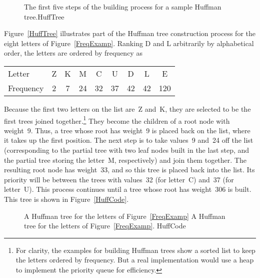 \begin{figure}
{The first five steps of the building process for a sample Huffman
tree.}{HuffTree}
\end{figure}

\begin{example}
Figure~\ref{HuffTree} illustrates part of the Huffman tree
construction process for the eight letters of Figure~\ref{FreqExamp}.
Ranking D and L arbitrarily by alphabetical order, 
the letters are ordered by frequency as

\medskip
\begin{center}
\begin{tabular}{|l|cccccccc|}
\hline
\rule{0pt}{11pt}Letter    & Z & K &  M &  C &  U &  D &  L &   E\\
\rule{0pt}{11pt}Frequency & 2 & 7 & 24 & 32 & 37 & 42 & 42 & 120\\
\hline
\end{tabular}
\end{center}

\medskip
Because the first two letters on the list are~Z and~K, they are
selected to be the first trees joined
together.\footnote{For clarity, the examples for building Huffman
trees show a sorted list to keep the letters ordered by frequency.
But a real implementation would use a heap to implement the priority
queue for efficiency.}
They become the children of a root node with weight~9.
Thus, a tree whose root has weight~9 is placed back on the list, where
it takes up the first position.
The next step is to take values~9 and~24 off the list (corresponding
to the partial tree with two leaf nodes built in the last step, and
the partial tree storing the letter~M, respectively) and join them
together.
The resulting root node has weight~33, and so this tree is placed
back into the list.
Its priority will be between the trees with values~32 (for letter~C)
and~37 (for letter~U).
This process continues until a tree whose root has weight~306 is
built.
This tree is shown in Figure~\ref{HuffCode}.
\end{example}

\begin{figure}
\vspace{-\bigskipamount}\vspace{-\bigskipamount}
\vspace{-\smallskipamount}

\capt{4.5in}
{A Huffman tree for the letters of Figure~\ref{FreqExamp}}
{A Huffman tree for the letters of Figure~\ref{FreqExamp}.}
{HuffCode}
\smallskip
\end{figure}

